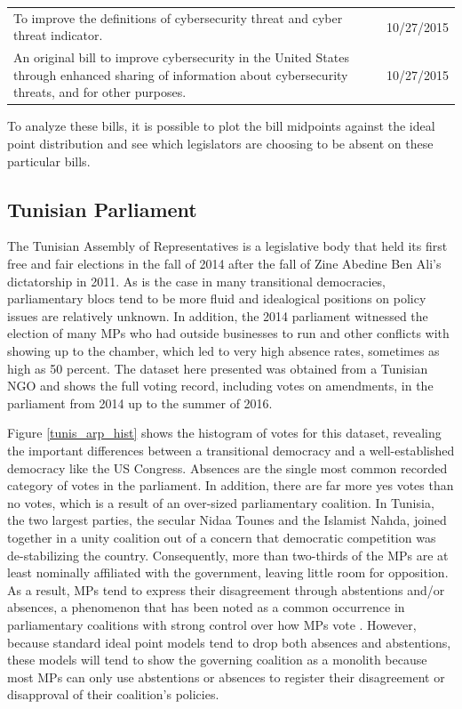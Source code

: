 \begin{table}[h!]
\begin{tabular}{p{6in}l}
		To improve the definitions of cybersecurity threat and cyber threat indicator.                                                                                                                                                           & 10/27/2015 \\
		An original bill to improve cybersecurity in the United States through enhanced sharing of information about cybersecurity threats, and for other purposes.                                                                              & 10/27/2015
	\end{tabular}
\end{table}

To analyze these bills, it is possible to plot the bill midpoints against the ideal point distribution and see which legislators are choosing to be absent on these particular bills. 


	
	\subsection*{Tunisian Parliament}
	
	The Tunisian Assembly of Representatives is a legislative body that held its first free and fair elections in the fall of 2014 after the fall of Zine Abedine Ben Ali's dictatorship in 2011. As is the case in many transitional democracies, parliamentary blocs tend to be more fluid and idealogical positions on policy issues are relatively unknown. In addition, the 2014 parliament witnessed the election of many MPs who had outside businesses to run and other conflicts with showing up to the chamber, which led to very high absence rates, sometimes as high as 50 percent. The dataset here presented was obtained from a Tunisian NGO and shows the full voting record, including votes on amendments, in the parliament from 2014 up to the summer of 2016. 
	
	Figure \ref{tunis_arp_hist} shows the histogram of votes for this dataset, revealing the important differences between a transitional democracy and a well-established democracy like the US Congress. Absences are the single most common recorded category of votes in the parliament. In addition, there are far more yes votes than no votes, which is a result of an over-sized parliamentary coalition. In Tunisia, the two largest parties, the secular Nidaa Tounes and the Islamist Nahda, joined together in a unity coalition out of a concern that democratic competition was de-stabilizing the country. Consequently, more than two-thirds of the MPs are at least nominally affiliated with the government, leaving little room for opposition. As a result, MPs tend to express their disagreement through abstentions and/or absences, a phenomenon that has been noted as a common occurrence in parliamentary coalitions with strong control over how MPs vote \parencite{brauninger2016}. However, because standard ideal point models tend to drop both absences and abstentions, these models will tend to show the governing coalition as a monolith because most MPs can only use abstentions or absences to register their disagreement or disapproval of their coalition's policies. 
	
